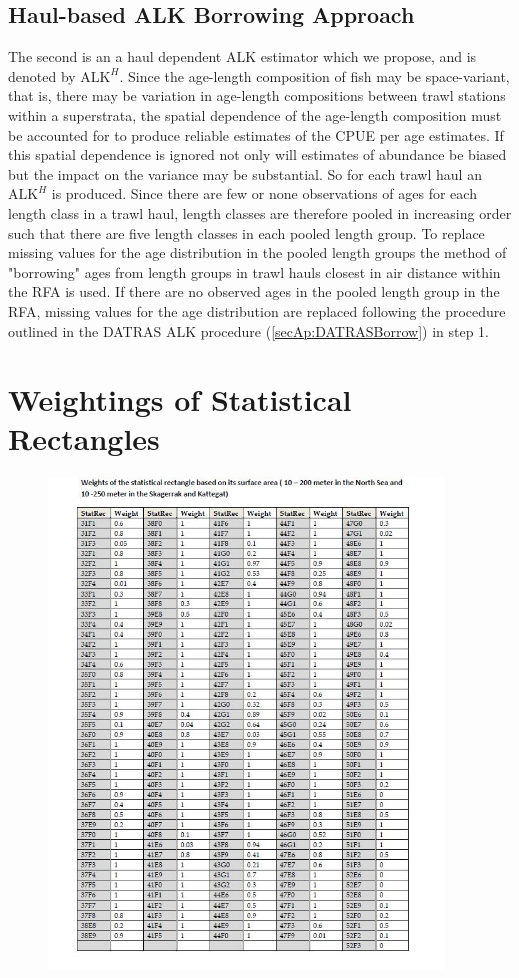 \documentclass[a4paper 12pt]{article}
\numberwithin{equation}{section}
\begin{document}
\begin{appendices}
\subsection{\normalsize Haul-based ALK Borrowing Approach}
\label{secAp:oursBorrow}
\indent  The second is an a haul dependent ALK estimator which we propose, and is denoted by $\mathrm{ALK}^{H}$. Since the age-length composition of fish may be space-variant, that is, there may be variation in age-length compositions between trawl stations within a superstrata, the spatial dependence of the age-length composition must be accounted for to produce reliable estimates of the CPUE per age estimates. If this spatial dependence is ignored not only will estimates of abundance be biased but the impact on the variance may be substantial. So for each trawl haul an $\mathrm{ALK}^{H}$ is produced. Since there are few or none observations of ages for each length class in a trawl haul, length classes are therefore pooled in increasing order such that there are five length classes in each pooled length group. To replace missing values for the age distribution in the pooled length groups the method of "borrowing" ages from length groups in trawl hauls closest in air distance within the RFA is used. If there are no observed ages in the pooled length group in the RFA, missing values for the age distribution are replaced following the procedure outlined in the DATRAS ALK procedure (\ref{secAp:DATRASBorrow}) in step 1.  
 \section{\large Weightings of Statistical Rectangles}
 \label{secAp:weightings}
\begin{figure}[h!]
  \centering
 {\includegraphics[width=10.5cm]{recWeightings.jpg}}   
 \captionsetup{font= footnotesize, width=15cm}{
 \caption{}\label{weightings11}}
\end{figure}
 
\end{appendices}
\end{document}
